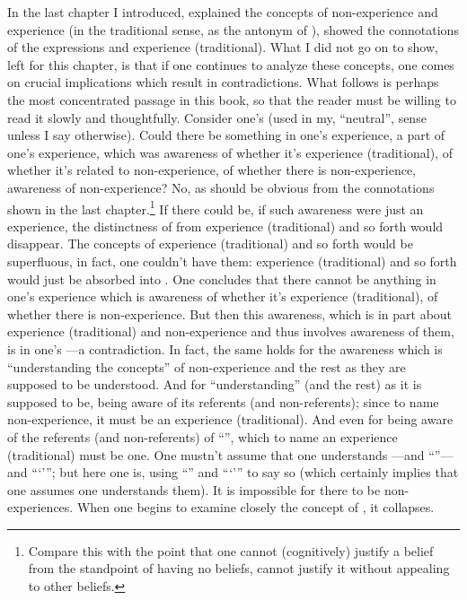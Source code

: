 In the last chapter I introduced, explained the concepts of 
non-ex\-per\-ience and experience (in the traditional sense, as the antonym of 
), showed the connotations of the expressions 
 and experience (traditional). What I did not go on to 
show, left for this chapter, is that if one continues to analyze these concepts, 
one comes on crucial implications which result in contradictions. What 
follows is perhaps the most concentrated passage in this book, so that the 
reader must be willing to read it slowly and thoughtfully. Consider one's 
 (used in my, \enquote{neutral}, sense unless I say otherwise). Could there 
be something in one's experience, a part of one's experience, which was 
awareness of whether it's experience (traditional), of whether it's related to 
non-experience, of whether there is non-experience, awareness of 
non-experience? No, as should be obvious from the connotations shown in 
the last chapter.\footnote{Compare this with the point that one cannot (cognitively) 
justify a belief from the standpoint of having no beliefs, cannot justify it 
without appealing to other beliefs.} If there could be, if such awareness were 
just an experience, the distinctness of  from experience 
(traditional) and so forth would disappear. The concepts of experience 
(traditional) and so forth would be superfluous, in fact, one couldn't have 
them: experience (traditional) and so forth would just be absorbed into 
. One concludes that there cannot be anything in one's experience 
which is awareness of whether it's experience (traditional), of whether there 
is non-experience. But then this awareness, which is in part about experience 
(traditional) and non-experience and thus involves awareness of them, is in 
one's ---a contradiction. In fact, the same holds for the awareness 
which is \enquote{understanding the concepts} of non-experience and the rest as 
they are supposed to be understood. And for \enquote{understanding}
 (and the rest) as it is supposed to be, being aware of its 
referents (and non-referents); since to name non-experience, it must be an 
experience (traditional). And even for being aware of the referents (and 
non-referents) of \enquote{}, which to name an experience 
(traditional) must be one. One mustn't assume that one understands 
---and \enquote{}---and \enquote{\enquote{}}; but here 
one is, using \enquote{} and \enquote{\enquote{}} to say so (which 
certainly implies that one assumes one understands them). It is impossible 
for there to be non-experiences. When one begins to examine closely the 
concept of , it collapses. 

